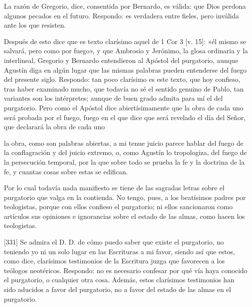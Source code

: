 La razón de Gregorio, dice, consentida por Bernardo, es válida: que Dios perdona algunos pecados en el futuro. Respondo: es verdadera entre fieles, pero inválida ante los que resisten.

Después de esto dice que es texto clarísimo aquel de 1 Cor 3 [v. 15]: «él mismo se salvará, pero como por fuego», y que Ambrosio y Jerónimo, la glosa ordinaria y la interlineal, Gregorio y Bernardo entendieron al Apóstol del purgatorio, aunque Agustín diga en algún lugar que las mismas palabras pueden entenderse del fuego del presente siglo. Respondo: tan poco clarísimo es este texto, que hoy confieso, tras haber examinado mucho, que todavía no sé el sentido genuino de Pablo, tan variantes son los intérpretes; aunque de buen grado admita para mí el del purgatorio. Pero como el Apóstol dice abiertísimamente que la obra de cada uno será probada por el fuego, fuego en el que dice que será revelado el día del Señor, que declarará la obra de cada uno

la obra, como son palabras abiertas, a mi tenue juicio parece hablar del fuego de la conflagración y del juicio extremo, o, como Agustín lo tropologiza, del fuego de la persecución temporal, por la que sobre todo se prueba la fe y la doctrina de la fe, y cuantas cosas sobre estas se edifican.

Por lo cual todavía nada manifiesto se tiene de las sagradas letras sobre el purgatorio que valga en la contienda. No tengo, pues, a los beatísimos padres por teologistas, porque con ellos confieso el purgatorio; ni ellos sancionaron como artículos sus opiniones e ignorancias sobre el estado de las almas, como hacen los teologistas.

[331] Se admira el D. D. de cómo puedo saber que existe el purgatorio, no teniendo yo ni un solo lugar en las Escrituras a mi favor, siendo así que estos, como dice, clarísimos testimonios de la Escritura juzga que favorecen a los teólogos neotéricos. Respondo: no es necesario confesar por qué vía haya conocido el purgatorio, o cualquier otra cosa. Además, estos clarísimos testimonios han sido aducidos a favor del purgatorio, no a favor del estado de las almas en el purgatorio.

